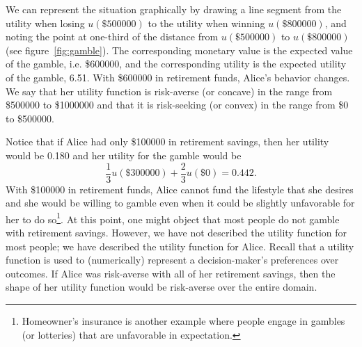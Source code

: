 We can represent the situation graphically by drawing a line segment
from the utility when losing
$u(\$\num{500000})$ to the utility when winning
$u(\$\num{800000})$, and noting the point at one-third of the distance
from $u(\$\num{500000})$ to
$u(\$\num{800000})$ (see figure~\vref{fig:gamble}).  The corresponding
monetary value is the expected value of the gamble,
i.e. \$\num{600000}, and the corresponding utility is the expected
utility of the gamble, 6.51. With \$\num{600000} in retirement funds,
Alice's behavior changes.  We say that her utility function is
risk-averse (or concave) in the range from \$\num{500000} to
\$\num{1000000} and that it is risk-seeking (or convex) in the range
from \$0 to \$\num{500000}.

Notice that if Alice had only \$\num{100000} in retirement savings,
then her utility would be 0.180 and her utility for the gamble would
be
\[
\frac{1}{3}u(\$\num{300000}) + \frac{2}{3}u(\$\num{0}) = 0.442.
\]
With \$\num{100000} in retirement funds, Alice cannot fund the
lifestyle that she desires and she would be willing to gamble even
when it could be slightly unfavorable for her to do
so\footnote{Homeowner's insurance is another example where people
  engage in gambles (or lotteries) that are unfavorable in
  expectation.}.  At this point, one might object that most people do
not gamble with retirement savings. However, we have not described the
utility function for most people; we have described the utility
function for Alice. Recall that a utility function is used to
(numerically) represent a decision-maker's preferences over outcomes.
If Alice was risk-averse with all of her retirement savings, then the
shape of her utility function would be risk-averse over the entire
domain.

\begin{comment}
\emph{Exercise 2.} Suppose Mr. Campbell has \$3. He is offered a fair bet
in which he wins \$2 with probability 1/3 or he loses \$1 with
probability 2/3. Should accept the bet? Suppose he is offered a
compound bet where win or lose he must repeat the above bet a second
time.  Should he accept the compound bet? What condition of the
Expected Utility Theorem should Mr. Campbell apply to his decision 
on whether to accept the compound bet?

\emph{Exercise 3.} Mrs. Campbell escorts her husband to sky-diving
school. For \$50 she can get \$5000 worth of insurance. Mr.  Campbell
laughs and says ``no''. He fully expects that nothing will go
wrong. Besides, he took both IE~3521 and IE~5545 and so he says that
the insurance company makes a profit by not giving people their
money's worth in insurance. Now, Mrs. Campbell makes her own
decisions. Should she purchase the insurance? Give an argument for or
against the insurance, and make use of utilities that you think are
reasonable.
\end{comment}

